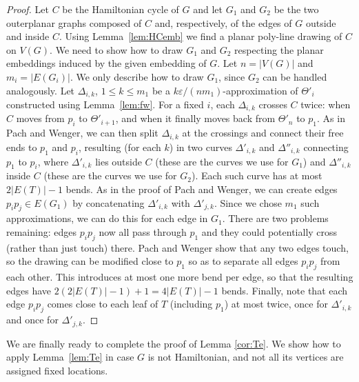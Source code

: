 \documentclass{llncs}
\begin{document}
\begin{proof}
 Let $C$ be the Hamiltonian cycle of $G$ and let $G_1$ and $G_2$ be the two outerplanar graphs composed of $C$ and, respectively, of the edges of $G$ outside and inside $C$.  Using Lemma~\ref{lem:HCemb} we find a planar poly-line drawing of $C$ on $V(G)$. We need to show how to draw $G_1$ and $G_2$ respecting the planar embeddings induced by the given embedding of $G$. Let $n = |V(G)|$ and $m_i = |E(G_i)|$.
 We only describe how to draw $G_1$, since $G_2$ can be handled analogously. Let $\Delta_{i,k}$, $1 \leq k \leq m_1$ be a $k\varepsilon/(nm_1)$-approximation of $\Theta'_i$ constructed using Lemma~\ref{lem:fw}. For a fixed $i$, each $\Delta_{i,k}$ crosses $C$ twice: when $C$ moves from $p_i$ to $\Theta'_{i+1}$, and when it finally moves back from $\Theta'_n$ to $p_1$. As in Pach and Wenger, we can then split $\Delta_{i,k}$ at the crossings and connect their free ends to $p_1$ and $p_i$, resulting (for each $k$) in two curves $\Delta'_{i,k}$ and $\Delta''_{i,k}$ connecting $p_1$ to $p_i$, where $\Delta'_{i,k}$ lies outside $C$ (these are the curves we use for $G_1$) and $\Delta''_{i,k}$ inside $C$ (these are the curves we use for $G_2$). Each such curve has at most $2|E(T)|-1$ bends. As in the proof of Pach and Wenger, we can create edges $p_ip_j \in E(G_1)$ by concatenating $\Delta'_{i,k}$ with $\Delta'_{j,k}$. Since we chose $m_1$ such approximations, we can do this for each edge in $G_1$. There are two problems remaining: edges $p_ip_j$ now all pass through $p_1$ and they could potentially cross (rather than just touch) there. Pach and Wenger show that any two edges touch, so the drawing can be modified close to $p_1$ so as to separate all edges $p_ip_j$ from each other. This introduces at most one more bend per edge, so that the resulting edges have $2(2|E(T)|-1) + 1 = 4|E(T)|-1$ bends. Finally, note that each edge $p_ip_j$ comes close to each leaf of $T$ (including $p_1$) at most twice, once for $\Delta'_{i,k}$ and once for  $\Delta'_{j,k}$.
\end{proof}

We are finally ready to complete the proof of Lemma \ref{cor:Te}. We show how to apply Lemma~\ref{lem:Te} in case $G$ is not Hamiltonian, and not all its vertices are assigned fixed locations.
\end{document}
